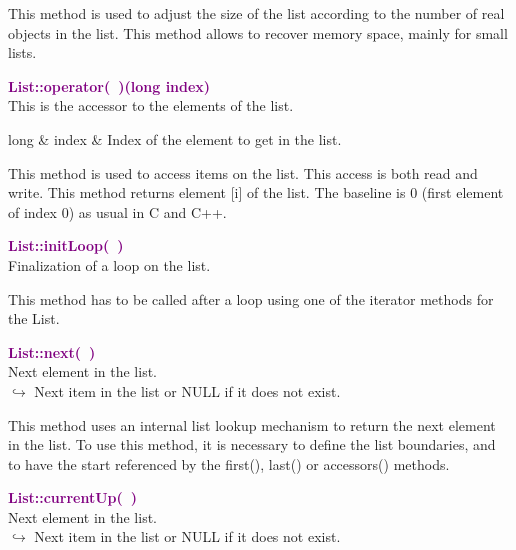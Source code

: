 This method is used to adjust the size of the list according to the number of real objects in the list.
This method allows to recover memory space, mainly for small lists.

\textcolor{purple}{\textbf{List::operator(~)(long index)}}\label{List::operator()(long index)}\\
This is the accessor to the elements of the list.

\begin{tcolorbox}[width=\textwidth,myArgs,tabularx={ll|R}]
long & index & Index of the element to get in the list.
\end{tcolorbox}

This method is used to access items on the list.
This access is both read and write.
This method returns element [i] of the list.
The baseline is 0 (first element of index 0) as usual in C and C++.

\textcolor{purple}{\textbf{List::initLoop(~)}}\label{List::initLoop()}\\
Finalization of a loop on the list.

This method has to be called after a loop using one of the iterator methods for the List.

\textcolor{purple}{\textbf{List::next(~)}}\label{List::next()}\\
Next element in the list.\\ \hspace*{10mm}$\hookrightarrow$ Next item in the list or NULL if it does not exist.

This method uses an internal list lookup mechanism to return the next element in the list.
To use this method, it is necessary to define the list boundaries, and to have the start referenced by the first(), last() or accessors() methods.

\textcolor{purple}{\textbf{List::currentUp(~)}}\label{List::currentUp()}\\
Next element in the list.\\ \hspace*{10mm}$\hookrightarrow$ Next item in the list or NULL if it does not exist.

